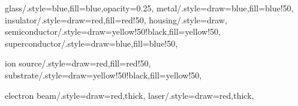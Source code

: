 glass/.style={blue,fill=blue,opacity=0.25},
metal/.style={draw=blue,fill=blue!50},
insulator/.style={draw=red,fill=red!50},
housing/.style={draw},
semiconductor/.style={draw=yellow!50!black,fill=yellow!50},
superconductor/.style={draw=blue,fill=blue!50},

ion source/.style={draw=red,fill=red!50},
substrate/.style={draw=yellow!50!black,fill=yellow!50},

electron beam/.style={draw=red,thick},
laser/.style={draw=red,thick},
